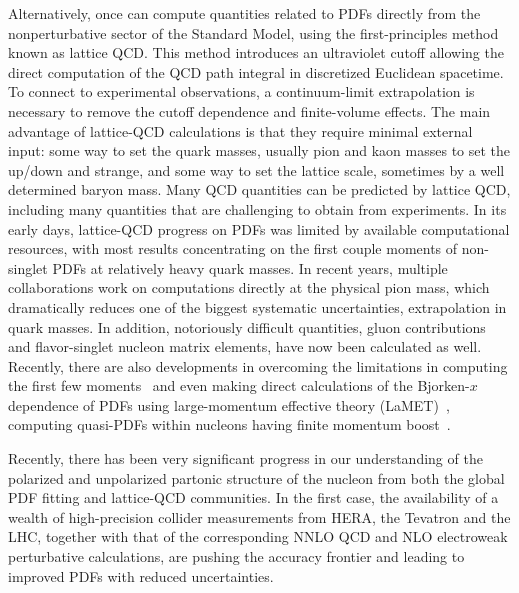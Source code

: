 Alternatively, once can compute quantities related to PDFs directly from the nonperturbative sector of the Standard Model, using the first-principles method known as lattice QCD. 
This method introduces an ultraviolet cutoff allowing 
the direct computation of the QCD path integral in discretized 
Euclidean spacetime. To connect to experimental observations, a continuum-limit extrapolation is necessary to remove the cutoff dependence and finite-volume effects.
%
The main advantage of lattice-QCD calculations is that they require minimal external input:
some way to set the quark masses, usually pion and kaon masses to set the up/down and strange,
and some way to set the lattice scale, sometimes by a well determined baryon mass. 
Many QCD quantities can be predicted by lattice QCD, including many quantities that are challenging to obtain from experiments. 
In its early days, lattice-QCD progress on PDFs was limited by available computational resources,
with most results concentrating on the first couple moments of non-singlet PDFs at relatively heavy quark masses. 
In recent years, multiple collaborations work on computations directly at the physical pion mass, which 
dramatically reduces one of the biggest systematic uncertainties, extrapolation in quark masses. In addition, notoriously difficult quantities, gluon contributions and flavor-singlet nucleon matrix elements, have now been calculated as well. Recently, there are also developments in overcoming the limitations in computing the first few moments~\cite{Constantinou:2014tga,Syritsyn:2014saa,Lin:2012ev} and even making direct calculations of the Bjorken-$x$ dependence of PDFs using large-momentum effective theory (LaMET)~\cite{Ji:2014gla}, computing quasi-PDFs within nucleons having finite momentum boost~\cite{Lin:2014zya,Alexandrou:2015rja,Chen:2016utp,Alexandrou:2016jqi}.

Recently, there has been very significant progress in our understanding
of the polarized and unpolarized partonic structure of the nucleon from both
the global PDF fitting and lattice-QCD communities.
%
In the first case, the availability of a wealth of high-precision collider measurements
from HERA, the Tevatron and the LHC, together with that of the corresponding
NNLO QCD and NLO electroweak perturbative calculations, are pushing the
accuracy frontier and leading to improved PDFs with reduced uncertainties.

